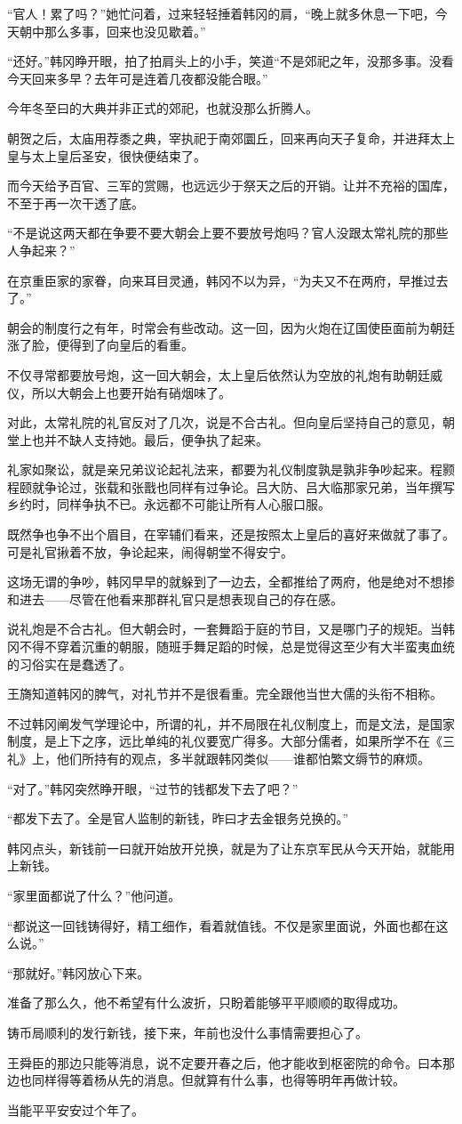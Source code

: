 “官人！累了吗？”她忙问着，过来轻轻捶着韩冈的肩，“晚上就多休息一下吧，今天朝中那么多事，回来也没见歇着。”

“还好。”韩冈睁开眼，拍了拍肩头上的小手，笑道“不是郊祀之年，没那多事。没看今天回来多早？去年可是连着几夜都没能合眼。”

今年冬至曰的大典并非正式的郊祀，也就没那么折腾人。

朝贺之后，太庙用荐黍之典，宰执祀于南郊圜丘，回来再向天子复命，并进拜太上皇与太上皇后圣安，很快便结束了。

而今天给予百官、三军的赏赐，也远远少于祭天之后的开销。让并不充裕的国库，不至于再一次干透了底。

“不是说这两天都在争要不要大朝会上要不要放号炮吗？官人没跟太常礼院的那些人争起来？”

在京重臣家的家眷，向来耳目灵通，韩冈不以为异，“为夫又不在两府，早推过去了。”

朝会的制度行之有年，时常会有些改动。这一回，因为火炮在辽国使臣面前为朝廷涨了脸，便得到了向皇后的看重。

不仅寻常都要放号炮，这一回大朝会，太上皇后依然认为空放的礼炮有助朝廷威仪，所以大朝会上也要开始有硝烟味了。

对此，太常礼院的礼官反对了几次，说是不合古礼。但向皇后坚持自己的意见，朝堂上也并不缺人支持她。最后，便争执了起来。

礼家如聚讼，就是亲兄弟议论起礼法来，都要为礼仪制度孰是孰非争吵起来。程颢程颐就争论过，张载和张戬也同样有过争论。吕大防、吕大临那家兄弟，当年撰写乡约时，同样争执不已。永远都不可能让所有人心服口服。

既然争也争不出个眉目，在宰辅们看来，还是按照太上皇后的喜好来做就了事了。可是礼官揪着不放，争论起来，闹得朝堂不得安宁。

这场无谓的争吵，韩冈早早的就躲到了一边去，全都推给了两府，他是绝对不想掺和进去——尽管在他看来那群礼官只是想表现自己的存在感。

说礼炮是不合古礼。但大朝会时，一套舞蹈于庭的节目，又是哪门子的规矩。当韩冈不得不穿着沉重的朝服，随班手舞足蹈的时候，总是觉得这至少有大半蛮夷血统的习俗实在是蠢透了。

王旖知道韩冈的脾气，对礼节并不是很看重。完全跟他当世大儒的头衔不相称。

不过韩冈阐发气学理论中，所谓的礼，并不局限在礼仪制度上，而是文法，是国家制度，是上下之序，远比单纯的礼仪要宽广得多。大部分儒者，如果所学不在《三礼》上，他们所持有的观点，多半就跟韩冈类似——谁都怕繁文缛节的麻烦。

“对了。”韩冈突然睁开眼，“过节的钱都发下去了吧？”

“都发下去了。全是官人监制的新钱，昨曰才去金银务兑换的。”

韩冈点头，新钱前一曰就开始放开兑换，就是为了让东京军民从今天开始，就能用上新钱。

“家里面都说了什么？”他问道。

“都说这一回钱铸得好，精工细作，看着就值钱。不仅是家里面说，外面也都在这么说。”

“那就好。”韩冈放心下来。

准备了那么久，他不希望有什么波折，只盼着能够平平顺顺的取得成功。

铸币局顺利的发行新钱，接下来，年前也没什么事情需要担心了。

王舜臣的那边只能等消息，说不定要开春之后，他才能收到枢密院的命令。曰本那边也同样得等着杨从先的消息。但就算有什么事，也得等明年再做计较。

当能平平安安过个年了。

